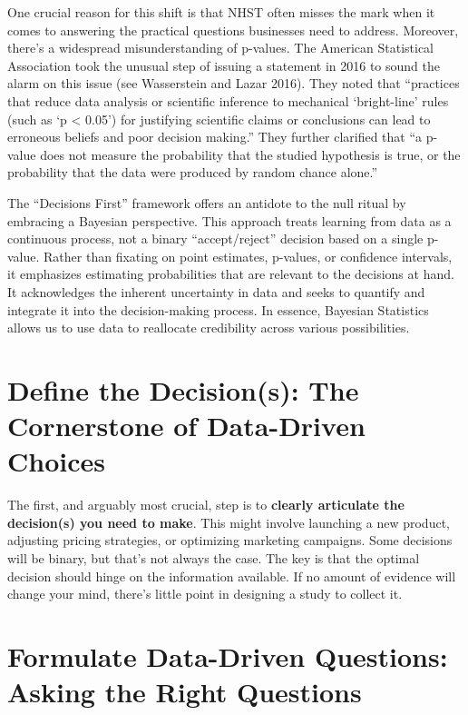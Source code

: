 \documentclass[
  letterpaper,
  DIV=11,
  numbers=noendperiod]{scrreprt}
\begin{document}
One crucial reason for this shift is that NHST often misses the mark
when it comes to answering the practical questions businesses need to
address. Moreover, there's a widespread misunderstanding of p-values.
The American Statistical Association took the unusual step of issuing a
statement in 2016 to sound the alarm on this issue (see Wasserstein and
Lazar 2016). They noted that ``practices that reduce data analysis or
scientific inference to mechanical `bright-line' rules (such as `p
\textless{} 0.05') for justifying scientific claims or conclusions can
lead to erroneous beliefs and poor decision making.'' They further
clarified that ``a p-value does not measure the probability that the
studied hypothesis is true, or the probability that the data were
produced by random chance alone.''

The ``Decisions First'' framework offers an antidote to the null ritual
by embracing a Bayesian perspective. This approach treats learning from
data as a continuous process, not a binary ``accept/reject'' decision
based on a single p-value. Rather than fixating on point estimates,
p-values, or confidence intervals, it emphasizes estimating
probabilities that are relevant to the decisions at hand. It
acknowledges the inherent uncertainty in data and seeks to quantify and
integrate it into the decision-making process. In essence, Bayesian
Statistics allows us to use data to reallocate credibility across
various possibilities.

\section{Define the Decision(s): The Cornerstone of Data-Driven
Choices}\label{define-the-decisions-the-cornerstone-of-data-driven-choices}

The first, and arguably most crucial, step is to \textbf{clearly
articulate the decision(s) you need to make}. This might involve
launching a new product, adjusting pricing strategies, or optimizing
marketing campaigns. Some decisions will be binary, but that's not
always the case. The key is that the optimal decision should hinge on
the information available. If no amount of evidence will change your
mind, there's little point in designing a study to collect it.

\section{Formulate Data-Driven Questions: Asking the Right
Questions}\label{formulate-data-driven-questions-asking-the-right-questions}
\end{document}

